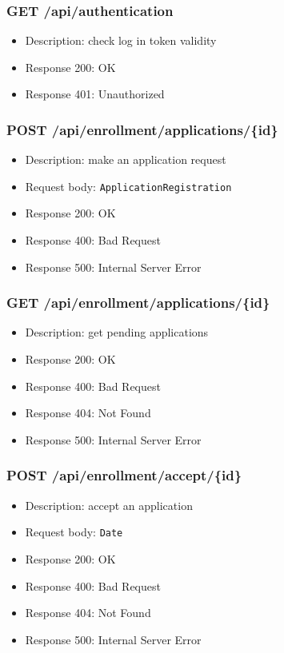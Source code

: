 \subsubsection{GET /api/authentication}
\begin{itemize}
    \item Description: check log in token validity
    \item Response 200: OK
    \item Response 401: Unauthorized
\end{itemize}

\subsubsection{POST /api/enrollment/applications/\{id\}}
\begin{itemize}
    \item Description: make an application request
    \item Request body: \verb|ApplicationRegistration|
    \item Response 200: OK
    \item Response 400: Bad Request
    \item Response 500: Internal Server Error
\end{itemize}

\subsubsection{GET /api/enrollment/applications/\{id\}}
\begin{itemize}
    \item Description: get pending applications
    \item Response 200: OK
    \item Response 400: Bad Request
    \item Response 404: Not Found
    \item Response 500: Internal Server Error
\end{itemize}

\subsubsection{POST /api/enrollment/accept/\{id\}}
\begin{itemize}
    \item Description: accept an application
    \item Request body: \verb|Date|
    \item Response 200: OK
    \item Response 400: Bad Request
    \item Response 404: Not Found
    \item Response 500: Internal Server Error
\end{itemize}

